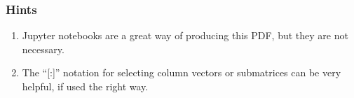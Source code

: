 \begin{frame}
  \frametitle{Hints}
  \begin{enumerate}
\item Jupyter notebooks are a great way of producing this PDF, but
  they are not necessary.
\item The ``[:]'' notation for selecting column vectors or submatrices
  can be very helpful, if used the right way.
\end{enumerate}
\end{frame}



